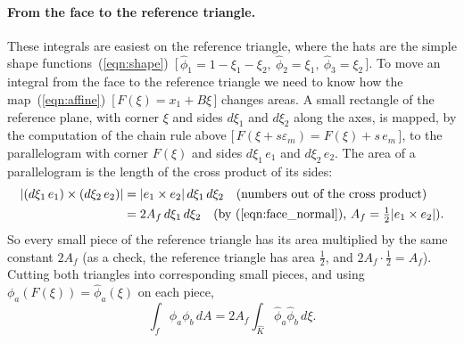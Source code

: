 \paragraph{From the face to the reference triangle.} These integrals are easiest on the reference triangle, where the hats are the simple shape functions~(\ref{eqn:shape})~[\,$\hat\phi_1 = 1 - \xi_1 - \xi_2,\ \hat\phi_2 = \xi_1,\ \hat\phi_3 = \xi_2$\,]. To move an integral from the face to the reference triangle we need to know how the map~(\ref{eqn:affine})~[\,$F(\xi) = x_1 + B\xi$\,] changes areas. A small rectangle of the reference plane, with corner $\xi$ and sides $d\xi_1$ and $d\xi_2$ along the axes, is mapped, by the computation of the chain rule above [\,$F(\xi + s\varepsilon_m) = F(\xi) + s\,e_m$\,], to the parallelogram with corner $F(\xi)$ and sides $d\xi_1\, e_1$ and $d\xi_2\, e_2$. The area of a parallelogram is the length of the cross product of its sides:
\begin{align*}
|(d\xi_1\, e_1) \times (d\xi_2\, e_2)| &= |e_1 \times e_2|\, d\xi_1\, d\xi_2 \quad \text{(numbers out of the cross product)}\\
&= 2A_f\, d\xi_1\, d\xi_2 \quad \text{(by~(\ref{eqn:face_normal}), } A_f = \tfrac12|e_1\times e_2|\text{)} .
\end{align*}
So every small piece of the reference triangle has its area multiplied by the same constant $2A_f$ (as a check, the reference triangle has area $\frac12$, and $2A_f \cdot \frac12 = A_f$). Cutting both triangles into corresponding small pieces, and using $\phi_a(F(\xi)) = \hat\phi_a(\xi)$ on each piece,
\begin{equation*}
\int_f \phi_a\phi_b\, dA = 2A_f\int_{\hat K}\hat\phi_a\hat\phi_b\, d\xi .
\end{equation*}

